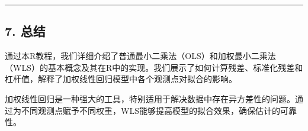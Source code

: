 \documentclass[
  10pt,
]{ctexart}
\begin{document}
\begin{center}\rule{0.5\linewidth}{0.5pt}\end{center}

\hypertarget{ux603bux7ed3}{%
\subsection{7. 总结}\label{ux603bux7ed3}}

通过本R教程，我们详细介绍了普通最小二乘法（OLS）和加权最小二乘法（WLS）的基本概念及其在R中的实现。我们展示了如何计算残差、标准化残差和杠杆值，解释了加权线性回归模型中各个观测点对拟合的影响。

加权线性回归是一种强大的工具，特别适用于解决数据中存在异方差性的问题。通过为不同观测点赋予不同权重，WLS能够提高模型的拟合效果，确保估计的可靠性。
\end{document}
